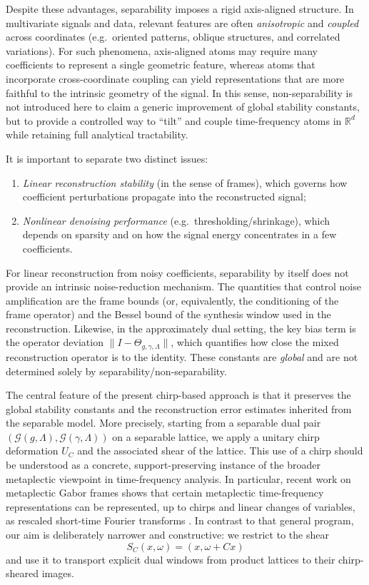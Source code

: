 \documentclass[final,1p,times,authoryear]{elsarticle}
\theoremstyle{definition}
\newcommand{\R}{\mathbb{R}}
\newcommand{\1}{\mathbf{1}}
\begin{document}
Despite these advantages, separability imposes a rigid axis-aligned structure.
In multivariate signals and data, relevant features are often \emph{anisotropic} and \emph{coupled} across
coordinates (e.g.\ oriented patterns, oblique structures, and correlated variations). For such phenomena,
axis-aligned atoms may require many coefficients to represent a single geometric feature, whereas atoms that
incorporate cross-coordinate coupling can yield representations that are more faithful to the intrinsic
geometry of the signal. In this sense, non-separability is not introduced here to claim a generic improvement
of global stability constants, but to provide a controlled way to ``tilt'' and couple time-frequency atoms in
$\R^d$ while retaining full analytical tractability.

It is important to separate two distinct issues:
\begin{enumerate}[label=\textup{(\roman*)}]
\item \emph{Linear reconstruction stability} (in the sense of frames), which governs how coefficient perturbations
propagate into the reconstructed signal;
\item \emph{Nonlinear denoising performance} (e.g.\ thresholding/shrinkage), which depends on sparsity and on how the
signal energy concentrates in a few coefficients.
\end{enumerate}
For linear reconstruction from noisy coefficients, separability by itself does not provide an intrinsic
noise-reduction mechanism. The quantities that control noise amplification are the frame bounds (or,
equivalently, the conditioning of the frame operator) and the Bessel bound of the synthesis window used in the
reconstruction. Likewise, in the approximately dual setting, the key bias term is the operator deviation
$\|I-\Theta_{g,\gamma,\Lambda}\|$, which quantifies how close the mixed reconstruction operator is to the identity.
These constants are \emph{global} and are not determined solely by separability/non-separability.

The central feature of the present chirp-based approach is that it preserves the global stability constants and
the reconstruction error estimates inherited from the separable model.
More precisely, starting from a separable dual pair
$(\mathcal G(g,\Lambda),\mathcal G(\gamma,\Lambda))$ on a separable lattice, we apply a unitary chirp deformation
$U_C$ and the associated shear of the lattice. This use of a chirp should be understood as a concrete,
support-preserving instance of the broader metaplectic viewpoint in time-frequency analysis. In particular,
recent work on metaplectic Gabor frames shows that certain metaplectic time-frequency representations can be
represented, up to chirps and linear changes of variables, as rescaled short-time Fourier transforms
\citep{CorderoGiacchi24}. In contrast to that general program, our aim is deliberately narrower and constructive:
we restrict to the shear
$$
S_C(x,\omega)=(x,\omega+Cx)
$$
{and use it to transport explicit dual windows from product lattices to their chirp-sheared images.}
\end{document}
